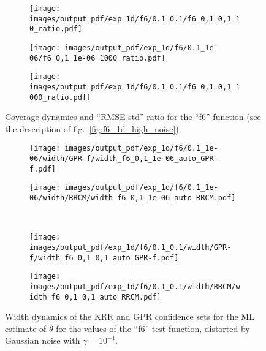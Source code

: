 \documentclass[a4paper,14pt]{extarticle}
\begin{document}
\begin{figure}
  \begin{subfigure}[b]{0.25\linewidth}
    \texttt{[image: images/output\_pdf/exp\_1d/f6/0.1\_0.1/f6\_0,1\_0,1\_10\_ratio.pdf]}
    \caption{} \label{fig:f6_1d_high_noise_arb_c2}
  \end{subfigure}%
  \begin{subfigure}[b]{0.25\linewidth}
    \texttt{[image: images/output\_pdf/exp\_1d/f6/0.1\_1e-06/f6\_0,1\_1e-06\_1000\_ratio.pdf]}
    \caption{} \label{fig:f6_1d_high_noise_arb_c3}
  \end{subfigure}%
  \begin{subfigure}[b]{0.25\linewidth}
    \texttt{[image: images/output\_pdf/exp\_1d/f6/0.1\_0.1/f6\_0,1\_0,1\_1000\_ratio.pdf]}
    \caption{} \label{fig:f6_1d_high_noise_arb_c4}
  \end{subfigure}%
  \caption{Coverage dynamics and ``RMSE-std'' ratio for the ``f6'' function (see
  the description of fig.~\ref{fig:f6_1d_high_noise}).}
  \label{fig:f6_1d_high_noise_arb}
\end{figure}

\begin{figure}%
  \centering
  \begin{subfigure}[b]{0.25\linewidth}
    \texttt{[image: images/output\_pdf/exp\_1d/f6/0.1\_1e-06/width/GPR-f/width\_f6\_0,1\_1e-06\_auto\_GPR-f.pdf]}
  \end{subfigure}%
  \begin{subfigure}[b]{0.25\linewidth}
    \texttt{[image: images/output\_pdf/exp\_1d/f6/0.1\_1e-06/width/RRCM/width\_f6\_0,1\_1e-06\_auto\_RRCM.pdf]}
  \end{subfigure}\\
  \begin{subfigure}[b]{0.25\linewidth}
    \texttt{[image: images/output\_pdf/exp\_1d/f6/0.1\_0.1/width/GPR-f/width\_f6\_0,1\_0,1\_auto\_GPR-f.pdf]}
    \caption{} \label{fig:f6_1d_high_noise_width_c1}
  \end{subfigure}%
  \begin{subfigure}[b]{0.25\linewidth}
    \texttt{[image: images/output\_pdf/exp\_1d/f6/0.1\_0.1/width/RRCM/width\_f6\_0,1\_0,1\_auto\_RRCM.pdf]}
    \caption{} \label{fig:f6_1d_high_noise_width_c2}
  \end{subfigure}
  \caption{Width dynamics of the KRR and GPR confidence sets for the ML estimate
  of $\theta$ for the values of the ``f6'' test function, distorted by Gaussian noise
  with $\gamma=10^{-1}$.}
  \label{fig:f6_1d_high_noise_width}
\end{figure}
\end{document}
